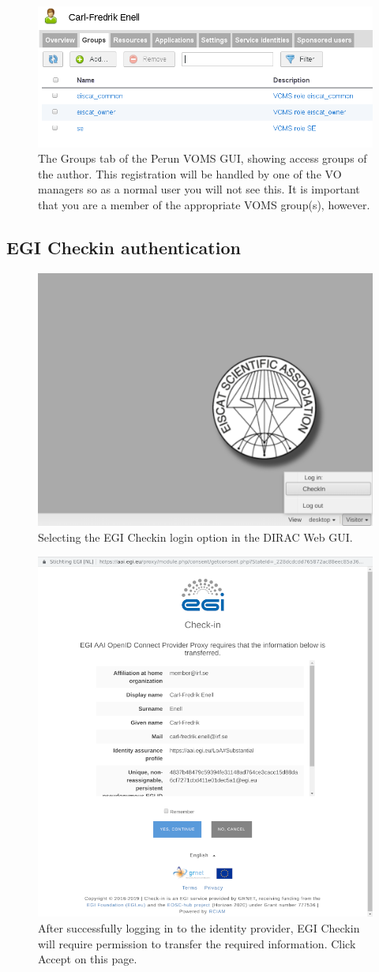\documentclass[a4paper]{article}
\begin{document}
\begin{figure}[htb]
  \centering
  \includegraphics[width=1.0\linewidth]{voms-groups-perun}
  \caption{The Groups tab of the Perun VOMS GUI, showing access groups of the author. This registration will be handled by one of the VO managers so as a normal user you will not see this. It is important that you are a member of the appropriate VOMS group(s), however.}
  \label{fig:perun}
\end{figure}


\subsection{EGI Checkin authentication}
\label{sec:checkin-auth}

\begin{figure}[htb]
  \centering
  \includegraphics[width=0.5\linewidth]{dirac-gui-checkin}
  \caption{Selecting the EGI Checkin login option in the DIRAC Web GUI.}
  \label{fig:checkin}
\end{figure}


\begin{figure}[htb]
  \centering
  \includegraphics[width=0.5\linewidth]{checkin-accept}
  \caption{After successfully logging in to the identity provider, EGI Checkin will require permission to transfer the required information. Click Accept on this page.}
  \label{fig:checkin}
\end{figure}
\end{document}
